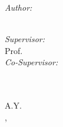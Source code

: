 \begin{titlingpage}
\begin{center}
		\begin{minipage}[t]{0.4\textwidth}
			\begin{flushleft} \large
				\emph{Author:}\\
				\textcolor{SchoolColor}{\AuthName \ \textsc{\AuthSurname}} %
			\end{flushleft}
		\end{minipage}
		\begin{minipage}[t]{0.4\textwidth}
			\begin{flushright} \large
				\emph{Supervisor:} \\
				\textcolor{SchoolColor}{Prof. \SupName \ \textsc{\SupSurname}} %
				\vspace{10pt}\\
				\emph{Co-Supervisor:} \\
				\textcolor{SchoolColor}{\CosupName \ \textsc{\CosupSurname}} %
			\end{flushright}
		\end{minipage}\\[4.35cm]
		{\large A.Y. \AcademicYear}\\[0.2cm]
		{\large \UnivPlace, \GraduationDay}\\[8cm] %
		\vfill
		\vfill
	\end{center}
\end{titlingpage}

